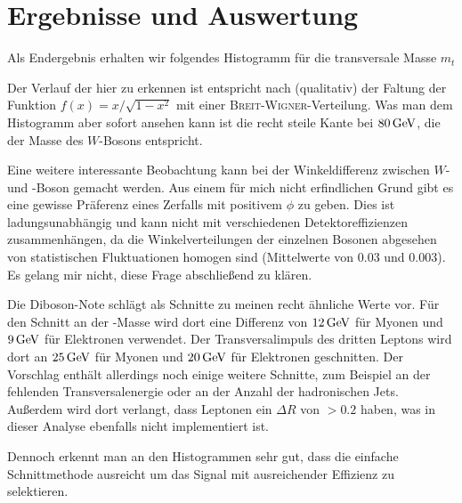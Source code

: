 \section{Ergebnisse und Auswertung}
Als Endergebnis erhalten wir folgendes Histogramm für die transversale Masse
$m_t$

\begin{center}
  
\end{center}

Der Verlauf der hier zu erkennen ist entspricht nach\cite{transv} (qualitativ)
der Faltung der Funktion $f(x) = x/\sqrt{1-x^2}$ mit einer
\textsc{Breit}-\textsc{Wigner}-Verteilung. Was man dem Histogramm aber sofort
ansehen kann ist die recht steile Kante bei $\unit[80]{GeV}$, die der Masse des
$W$-Bosons entspricht.

Eine weitere interessante Beobachtung kann bei der Winkeldifferenz zwischen $W$-
und \Z-Boson gemacht werden. Aus einem für mich nicht erfindlichen Grund gibt es
eine gewisse Präferenz eines Zerfalls mit positivem $\phi$ zu geben. Dies ist
ladungsunabhängig und kann nicht mit verschiedenen Detektoreffizienzen
zusammenhängen, da die Winkelverteilungen der einzelnen Bosonen abgesehen von
statistischen Fluktuationen homogen sind (Mittelwerte von $0.03$ und $0.003$).
Es gelang mir nicht, diese Frage abschließend zu klären.

\begin{center}
  
\end{center}

Die Diboson-Note schlägt als Schnitte zu meinen recht ähnliche Werte vor. Für
den Schnitt an der \Z-Masse wird dort eine Differenz von $\unit[12]{GeV}$ für
Myonen und $\unit[9]{GeV}$ für Elektronen verwendet. Der Transversalimpuls des
dritten Leptons wird dort an $\unit[25]{GeV}$ für Myonen und $\unit[20]{GeV}$
für Elektronen geschnitten. Der Vorschlag enthält allerdings noch einige weitere
Schnitte, zum Beispiel an der fehlenden Transversalenergie oder an der Anzahl
der hadronischen Jets. Außerdem wird dort verlangt, dass Leptonen ein $\Delta R$
von $> 0.2$ haben, was in dieser Analyse ebenfalls nicht implementiert ist.

Dennoch erkennt man an den Histogrammen sehr gut, dass die einfache
Schnittmethode ausreicht um das Signal mit ausreichender Effizienz zu
selektieren.
\newpage
